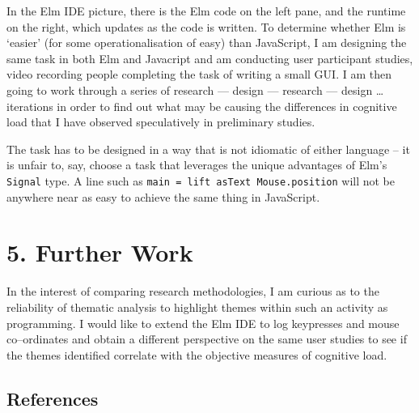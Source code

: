 \documentclass[final]{beamer}
\begin{document}
\begin{frame}[t]
\begin{multicols}{3}
In the Elm IDE picture, there is the Elm code on the left pane, and the runtime
on the right, which updates as the code is written. To determine whether Elm is
`easier' (for some operationalisation of easy) than JavaScript, I am designing
the same task in both Elm and Javacript and am conducting user participant
studies, video recording people completing the task of writing a small GUI. I am
then going to work through a series of research --- design --- research ---
design \ldots iterations in order to find out what may be causing the differences in
cognitive load that I have observed speculatively in preliminary studies.

The task has to be designed in a way that is not idiomatic of either language --
it is unfair to, say, choose a task that leverages the unique advantages of
Elm's \texttt{Signal} type. A line such as \texttt{main = lift asText
Mouse.position} will not be anywhere near as easy to achieve the same thing in
JavaScript. 

\section{5. Further Work}

In the interest of comparing research methodologies, I am curious as to the
reliability of thematic analysis to highlight themes within such an activity as
programming. I would like to extend the Elm IDE to log keypresses and mouse
co--ordinates and obtain a different perspective on the same user studies to see
if the themes identified correlate with the objective measures of cognitive
load.




\subsection{References}







\end{multicols}

\end{frame}
\end{document}
